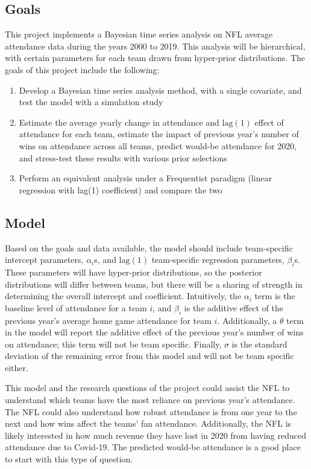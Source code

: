 \documentclass[11pt]{article}
\begin{document}
\vspace*{-.5\baselineskip}
\subsection{Goals}

This project implements a Bayesian time series analysis on NFL average attendance data during the years 2000 to 2019. This analysis will be hierarchical, with certain parameters for each team drawn from hyper-prior distributions. The goals of this project include the following:
\begin{enumerate}
    \item Develop a Bayesian time series analysis method, with a single covariate, and test the model with a simulation study
    \item Estimate the average yearly change in attendance and $\text{lag}(1)$ effect of attendance for each team, estimate the impact of previous year's number of wins on attendance across all teams, predict would-be attendance for 2020, and stress-test these results with various prior selections
    \item Perform an equivalent analysis under a Frequentist paradigm (linear regression with lag(1) coefficient) and compare the two 
\end{enumerate}

\vspace*{-.5\baselineskip}
\subsection{Model}

Based on the goals and data available, the model should include team-specific intercept parameters, $\alpha_i$s, and $\text{lag}(1)$ team-specific regression parameters, $\beta_{i}$s. These parameters will have hyper-prior distributions, so the posterior distributions will differ between teams, but there will be a sharing of strength in determining the overall intercept and coefficient. Intuitively, the $\alpha_i$ term is the baseline level of attendance for a team $i$, and $\beta_i$ is the additive effect of the previous year's average home game attendance for team $i$. Additionally, a $\theta$ term in the model will report the additive effect of the previous year's number of wins on attendance; this term will not be team specific. Finally, $\sigma$ is the standard deviation of the remaining error from this model and will not be team specific either. 

This model and the research questions of the project could assist the NFL to understand which teams have the most reliance on previous year's attendance. The NFL could also understand how robust attendance is from one year to the next and how wins affect the teams' fan attendance. Additionally, the NFL is likely interested in how much revenue they have lost in 2020 from having reduced attendance due to Covid-19. The predicted would-be attendance is a good place to start with this type of question.
\end{document}
